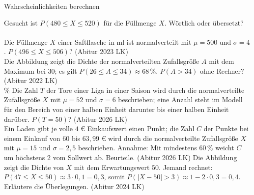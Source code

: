\setcounter{aufgabe}{9}

\begin{aufgabe}{Wahrscheinlichkeiten berechnen}
\begin{teile}
\teil Gesucht ist $P(480 \le X \le 520)$ für die Füllmenge $X$. Wörtlich oder übersetzt? \\  \\ 
\teil Die Füllmenge $X$ einer Saftflasche in ml ist normalverteilt mit $\mu = 500$ und $\sigma = 4$. $P(496 \le X \le 506)$? \hfill (Abitur 2023 LK) \\ \leerfeld
\teil Die Abbildung zeigt die Dichte der normalverteilten Zufallsgröße $A$ mit dem Maximum bei $30$; es gilt $P(26 \le A \le 34) \approx 68\,\%$. $P(A > 34)$ ohne Rechner? \hfill (Abitur 2022 LK) \\

\leerfeld \%
\teil Die Zahl $T$ der Tore einer Liga in einer Saison wird durch die normalverteilte Zufallsgröße $X$ mit $\mu = 52$ und $\sigma = 6$ beschrieben; eine Anzahl steht im Modell für den Bereich von einer halben Einheit darunter bis einer halben Einheit darüber. $P(T = 50)$? \hfill (Abitur 2026 LK) \\ \leerfeld
\teil Ein Laden gibt je volle $4$ € Einkaufswert einen Punkt; die Zahl $C$ der Punkte bei einem Einkauf von $60$ bis $63{,}99$ € wird durch die normalverteilte Zufallsgröße $X$ mit $\mu = 15$ und $\sigma = 2{,}5$ beschrieben. Annahme: Mit mindestens $60\,\%$ weicht $C$ um höchstens $2$ vom Sollwert ab. Beurteile. \hfill (Abitur 2026 LK)
\teil Die Abbildung zeigt die Dichte von $X$ mit dem Erwartungswert $50$. Jemand rechnet: $P(47 \le X \le 50) \approx 3 \cdot 0{,}1 = 0{,}3$, somit $P(|X - 50| > 3) \approx 1 - 2 \cdot 0{,}3 = 0{,}4$. Erläutere die Überlegungen. \hfill (Abitur 2024 LK)

\end{teile}
\end{aufgabe}

